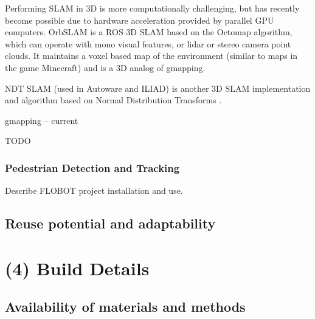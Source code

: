 \documentclass[a4paper]{article}
\begin{document}
Performing SLAM in 3D is more computationally challenging, but has recently become possible due to hardware acceleration provided by parallel GPU computers.
OrbSLAM is a ROS 3D SLAM based on the Octomap algorithm, which can operate with mono visual features, or lidar or stereo camera point clouds. It maintains a voxel based map of the environment (similar to maps in the game Minecraft) and is a 3D analog of gmapping.

NDT SLAM  (used in Autoware and ILIAD) is another 3D SLAM implementation and algorithm based on Normal Distribution Transforms \cite{einhorn2015generic}.

gmapping -- current

TODO


\subsubsection{Pedestrian Detection and Tracking}

Describe FLOBOT project installation and use.


\subsection{Reuse potential and adaptability}\label{h.6wkumyl0ejrh}





\section{(4) Build Details}\label{h.l8i9vokvs0bj}

\subsection{Availability of materials and methods}\label{h.60suejv0jlzi}
\end{document}
